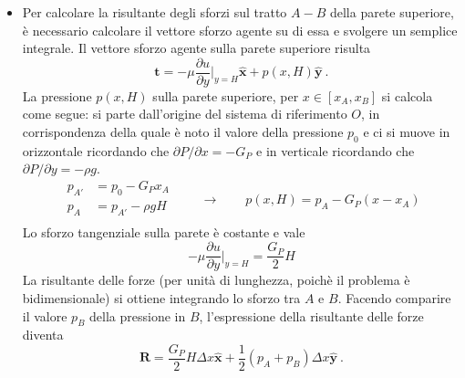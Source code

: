 \begin{itemize}
\item
Per calcolare la risultante degli sforzi sul tratto $A-B$ della parete 
 superiore, è necessario calcolare il vettore sforzo agente su di essa
 e svolgere un semplice integrale.
Il vettore sforzo agente sulla parete superiore risulta
 \begin{equation}
  \bm{t} = - \mu \dfrac{\partial u}{\partial y}\bigg|_{y=H} \bm{\hat{x}} +
           p(x,H) \bm{\hat{y}} \ .
 \end{equation}
 La pressione $p(x,H)$ sulla parete superiore, per $x \in [x_A,x_B]$ si
 calcola come segue: si parte dall'origine del sistema di riferimento $O$,
 in corrispondenza della quale è noto il valore della pressione $p_0$ e ci 
 si muove in orizzontale ricordando che $\partial P/\partial x = -G_P$ e
 in verticale ricordando che $\partial P/\partial y = -\rho g$.
 \begin{equation}
 \begin{aligned}
  p_{A'} & = p_0 - G_P x_A \\
  p_{A } & = p_{A'} - \rho g H  \\
 \end{aligned}
 \qquad \rightarrow  \qquad p(x,H)  = p_{A} - G_P ( x  -x_A )
 \end{equation}
 Lo sforzo tangenziale sulla parete è costante e vale
 \begin{equation}
  - \mu \dfrac{\partial u}{\partial y}\bigg|_{y=H} =
    \dfrac{G_P}{2} H
 \end{equation}
 La risultante delle forze (per unità di lunghezza, poichè il problema
  è bidimensionale) si ottiene integrando lo sforzo tra $A$ e $B$. Facendo comparire il valore $p_B$ della pressione in $B$, l'espressione della risultante delle forze diventa
 \begin{equation}
  \bm{R} = \dfrac{G_P}{2} H \Delta x \bm{\hat{x}} + 
           \dfrac{1}{2}(p_A + p_B) \Delta x \bm{\hat{y}} \ .
 \end{equation}


\end{itemize}
